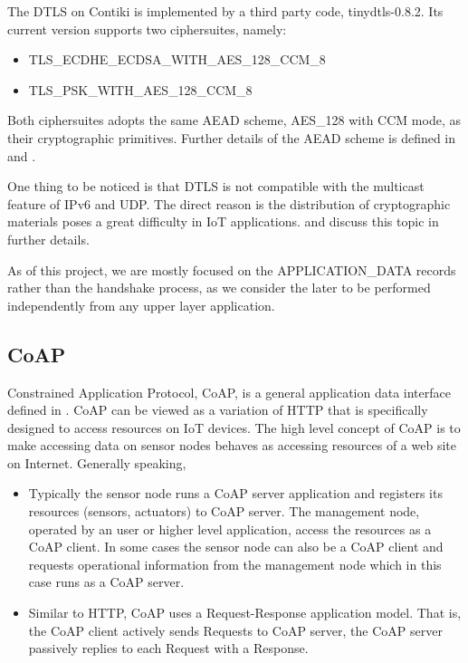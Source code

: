 The DTLS on Contiki is implemented by a third party code, tinydtls-0.8.2\cite{tinydtls}. Its current version supports two ciphersuites, namely:
\begin{itemize}
	\item TLS\_ECDHE\_ECDSA\_WITH\_AES\_128\_CCM\_8\cite{rfc7251}
	\item TLS\_PSK\_WITH\_AES\_128\_CCM\_8\cite{rfc6655}
\end{itemize}
Both ciphersuites adopts the same AEAD scheme, AES\_128 with CCM mode, as their cryptographic primitives. Further details of the AEAD scheme is defined in \cite{rfc5116} and \cite{CCM}.

One thing to be noticed is that DTLS is not compatible with the multicast feature of IPv6 and UDP. The direct reason is the distribution of cryptographic materials poses a great difficulty in IoT applications. \cite{DtlsMulticast1} and \cite{DtlsMulticast2} discuss this topic in further details.

As of this project, we are mostly focused on the APPLICATION\_DATA records rather than the handshake process, as we consider the later to be performed independently from any upper layer application.

\subsection{CoAP}
Constrained Application Protocol, CoAP, is a general application data interface defined in \cite{rfc7252}. CoAP can be viewed as a variation of HTTP that is specifically designed to access resources on IoT devices. The high level concept of CoAP is to make accessing data on sensor nodes behaves as accessing resources of a web site on Internet. Generally speaking,
\begin{itemize}
	\item Typically the sensor node runs a CoAP server application and registers its resources (sensors, actuators) to CoAP server. The management node, operated by an user or higher level application, access the resources as a CoAP client. In some cases the sensor node can also be a CoAP client and requests operational information from the management node which in this case runs as a CoAP server.
	\item Similar to HTTP, CoAP uses a Request-Response application model. That is, the CoAP client actively sends Requests to CoAP server, the CoAP server passively replies to each Request with a Response.
\end{itemize}

